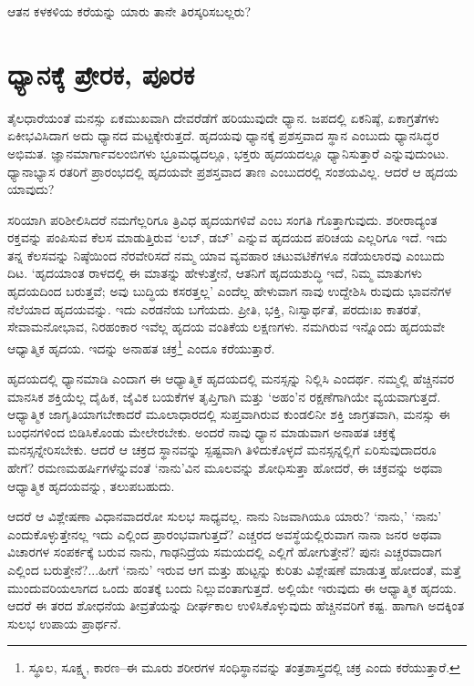 ಆತನ ಕಳಕಳಿಯ ಕರೆಯನ್ನು ಯಾರು ತಾನೇ ತಿರಸ್ಕರಿಸಬಲ್ಲರು?


\section{ಧ್ಯಾನಕ್ಕೆ ಪ್ರೇರಕ, ಪೂರಕ}

ತೈಲಧಾರೆಯಂತೆ ಮನಸ್ಸು ಏಕಮುಖವಾಗಿ ದೇವರೆಡೆಗೆ ಹರಿಯುವುದೇ ಧ್ಯಾನ. ಜಪದಲ್ಲಿ ಏಕನಿಷ್ಠೆ, ಏಕಾಗ್ರತೆಗಳು ಏಕೀಭವಿಸಿದಾಗ ಅದು ಧ್ಯಾನದ ಮಟ್ಟಕ್ಕೇರುತ್ತದೆ. ಹೃದಯವು ಧ್ಯಾನಕ್ಕೆ ಪ್ರಶಸ್ತವಾದ ಸ್ಥಾನ ಎಂಬುದು ಧ್ಯಾನಸಿದ್ಧರ ಅಭಿಮತ. ಜ್ಞಾನಮಾರ್ಗಾವಲಂಬಿಗಳು ಭ್ರೂಮಧ್ಯದಲ್ಲೂ, ಭಕ್ತರು ಹೃದಯದಲ್ಲೂ ಧ್ಯಾನಿಸುತ್ತಾರೆ ಎನ್ನುವುದುಂಟು. ಧ್ಯಾನಾಭ್ಯಾಸ ರತರಿಗೆ ಪ್ರಾರಂಭದಲ್ಲಿ ಹೃದಯವೇ ಪ್ರಶಸ್ತವಾದ ತಾಣ ಎಂಬುದರಲ್ಲಿ ಸಂಶಯವಿಲ್ಲ. ಆದರೆ ಆ ಹೃದಯ ಯಾವುದು?

ಸರಿಯಾಗಿ ಪರಿಶೀಲಿಸಿದರೆ ನಮಗೆಲ್ಲರಿಗೂ ತ್ರಿವಿಧ ಹೃದಯಗಳಿವೆ ಎಂಬ ಸಂಗತಿ ಗೊತ್ತಾಗುವುದು. ಶರೀರಾದ್ಯಂತ ರಕ್ತವನ್ನು ಪಂಪಿಸುವ ಕೆಲಸ ಮಾಡುತ್ತಿರುವ ‘ಲಬ್, ಡಬ್​’ ಎನ್ನುವ ಹೃದಯದ ಪರಿಚಯ ಎಲ್ಲರಿಗೂ ಇದೆ. ಇದು ತನ್ನ ಕೆಲಸವನ್ನು ನಿಷ್ಠೆಯಿಂದ ನೆರವೇರಿಸದೆ ನಮ್ಮ ಯಾವ ವ್ಯವಹಾರ ಚಟುವಟಿಕೆಗಳೂ ನಡೆಯಲಾರವು ಎಂಬುದು ದಿಟ. ‘ಹೃದಯಾಂತ ರಾಳದಲ್ಲಿ ಈ ಮಾತನ್ನು ಹೇಳುತ್ತೇನೆ, ಆತನಿಗೆ ಹೃದಯಶುದ್ಧಿ ಇದೆ, ನಿಮ್ಮ ಮಾತುಗಳು ಹೃದಯದಿಂದ ಬರುತ್ತವೆ; ಅವು ಬುದ್ಧಿಯ ಕಸರತ್ತಲ್ಲ’ ಎಂದೆಲ್ಲ ಹೇಳುವಾಗ ನಾವು ಉದ್ದೇಶಿಸಿ ರುವುದು ಭಾವನೆಗಳ ನೆಲೆಯಾದ ಹೃದಯವನ್ನು. ಇದು ಎರಡನೆಯ ಬಗೆಯದು. ಪ್ರೀತಿ, ಭಕ್ತಿ, ನಿಃಸ್ವಾರ್ಥತೆ, ಪರದುಃಖ ಕಾತರತೆ, ಸೇವಾಮನೋಭಾವ, ನಿರಹಂಕಾರ ಇವೆಲ್ಲ ಹೃದಯ ವಂತಿಕೆಯ ಲಕ್ಷಣಗಳು. ನಮಗಿರುವ ಇನ್ನೊಂದು ಹೃದಯವೇ ಆಧ್ಯಾತ್ಮಿಕ ಹೃದಯ. ಇದನ್ನು ಅನಾಹತ ಚಕ್ರ\footnote{ ಸ್ಥೂಲ, ಸೂಕ್ಷ್ಮ, ಕಾರಣ–ಈ ಮೂರು ಶರೀರಗಳ ಸಂಧಿಸ್ಥಾನವನ್ನು ತಂತ್ರಶಾಸ್ತ್ರದಲ್ಲಿ ಚಕ್ರ ಎಂದು ಕರೆಯುತ್ತಾರೆ.} ಎಂದೂ ಕರೆಯುತ್ತಾರೆ.

ಹೃದಯದಲ್ಲಿ ಧ್ಯಾನಮಾಡಿ ಎಂದಾಗ ಈ ಆಧ್ಯಾತ್ಮಿಕ ಹೃದಯದಲ್ಲಿ ಮನಸ್ಸನ್ನು ನಿಲ್ಲಿಸಿ ಎಂದರ್ಥ. ನಮ್ಮಲ್ಲಿ ಹೆಚ್ಚಿನವರ ಮಾನಸಿಕ ಶಕ್ತಿಯೆಲ್ಲ ದೈಹಿಕ, ಜೈವಿಕ ಬಯಕೆಗಳ ತೃಪ್ತಿಗಾಗಿ ಮತ್ತು ‘ಅಹಂ’ನ ರಕ್ಷಣೆಗಾಗಿಯೇ ವ್ಯಯವಾಗುತ್ತದೆ. ಆಧ್ಯಾತ್ಮಿಕ ಜಾಗೃತಿಯಾಗಬೇಕಾದರೆ ಮೂಲಾಧಾರದಲ್ಲಿ ಸುಪ್ತವಾಗಿರುವ ಕುಂಡಲಿನೀ ಶಕ್ತಿ ಜಾಗ್ರತವಾಗಿ, ಮನಸ್ಸು ಈ ಬಂಧನಗಳಿಂದ ಬಿಡಿಸಿಕೊಂಡು ಮೇಲೇರಬೇಕು. ಅಂದರೆ ನಾವು ಧ್ಯಾನ ಮಾಡುವಾಗ ಅನಾಹತ ಚಕ್ರಕ್ಕೆ ಮನಸ್ಸನ್ನೇರಿಸಬೇಕು. ಆದರೆ ಆ ಚಕ್ರದ ಸ್ಥಾನವನ್ನು ಸ್ಪಷ್ಟವಾಗಿ ತಿಳಿದುಕೊಳ್ಳದೆ ಮನಸ್ಸನ್ನಲ್ಲಿಗೆ ಏರಿಸುವುದಾದರೂ ಹೇಗೆ? ರಮಣಮಹರ್ಷಿಗಳೆನ್ನುವಂತೆ ‘ನಾನು’ವಿನ ಮೂಲವನ್ನು ಶೋಧಿಸುತ್ತಾ ಹೋದರೆ, ಈ ಚಕ್ರವನ್ನು ಅಥವಾ ಆಧ್ಯಾತ್ಮಿಕ ಹೃದಯವನ್ನು, ತಲುಪಬಹುದು.

ಆದರೆ ಆ ವಿಶ್ಲೇಷಣಾ ವಿಧಾನವಾದರೋ ಸುಲಭ ಸಾಧ್ಯವಲ್ಲ. ನಾನು ನಿಜವಾಗಿಯೂ ಯಾರು? ‘ನಾನು,’ ‘ನಾನು’ ಎಂದುಕೊಳ್ಳುತ್ತೇನಲ್ಲ ಇದು ಎಲ್ಲಿಂದ ಪ್ರಾರಂಭವಾಗುತ್ತದೆ? ಎಚ್ಚರದ ಅವಸ್ಥೆಯಲ್ಲಿರುವಾಗ ನಾನಾ ಜನರ ಅಥವಾ ವಿಚಾರಗಳ ಸಂಪರ್ಕಕ್ಕೆ ಬರುವ ನಾನು, ಗಾಢನಿದ್ರೆಯ ಸಮಯದಲ್ಲಿ ಎಲ್ಲಿಗೆ ಹೋಗುತ್ತೇನೆ? ಪುನಃ ಎಚ್ಚರವಾದಾಗ ಎಲ್ಲಿಂದ ಬರುತ್ತೇನೆ?...ಹೀಗೆ ‘ನಾನು’ ಇರುವ ಆಗ ಮತ್ತು ಹುಟ್ಟನ್ನು ಕುರಿತು ವಿಶ್ಲೇಷಣೆ ಮಾಡುತ್ತ ಹೋದಂತೆ, ಮತ್ತೆ ಮುಂದುವರಿಯಲಾಗದ ಒಂದು ಹಂತಕ್ಕೆ ಬಂದು ನಿಲ್ಲುವಂತಾಗುತ್ತದೆ. ಅಲ್ಲಿಯೇ ಇರುವುದು ಈ ಆಧ್ಯಾತ್ಮಿಕ ಹೃದಯ. ಆದರೆ ಈ ತರದ ಶೋಧನೆಯ ತೀವ್ರತೆಯನ್ನು ದೀರ್ಘಕಾಲ ಉಳಿಸಿಕೊಳ್ಳುವುದು ಹೆಚ್ಚಿನವರಿಗೆ ಕಷ್ಟ. ಹಾಗಾಗಿ ಅದಕ್ಕಿಂತ ಸುಲಭ ಉಪಾಯ ಪ್ರಾರ್ಥನೆ.


